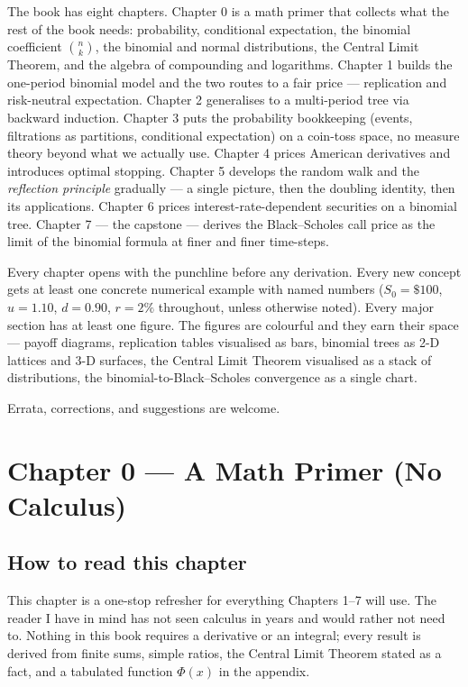 \documentclass[
  10pt,
  twoside]{book}
\begin{document}
The book has eight chapters. Chapter 0 is a math primer that collects
what the rest of the book needs: probability, conditional expectation,
the binomial coefficient \(\binom{n}{k}\), the binomial and normal
distributions, the Central Limit Theorem, and the algebra of compounding
and logarithms. Chapter 1 builds the one-period binomial model and the
two routes to a fair price --- replication and risk-neutral expectation.
Chapter 2 generalises to a multi-period tree via backward induction.
Chapter 3 puts the probability bookkeeping (events, filtrations as
partitions, conditional expectation) on a coin-toss space, no measure
theory beyond what we actually use. Chapter 4 prices American
derivatives and introduces optimal stopping. Chapter 5 develops the
random walk and the \emph{reflection principle} gradually --- a single
picture, then the doubling identity, then its applications. Chapter 6
prices interest-rate-dependent securities on a binomial tree. Chapter 7
--- the capstone --- derives the Black--Scholes call price as the limit
of the binomial formula at finer and finer time-steps.

Every chapter opens with the punchline before any derivation. Every new
concept gets at least one concrete numerical example with named numbers
(\(S_0=\$100\), \(u=1.10\), \(d=0.90\), \(r=2\%\) throughout, unless
otherwise noted). Every major section has at least one figure. The
figures are colourful and they earn their space --- payoff diagrams,
replication tables visualised as bars, binomial trees as 2-D lattices
and 3-D surfaces, the Central Limit Theorem visualised as a stack of
distributions, the binomial-to-Black--Scholes convergence as a single
chart.

Errata, corrections, and suggestions are welcome.

\newpage

\newpage

\chapter{Chapter 0 --- A Math Primer (No
Calculus)}\label{chapter-0-a-math-primer-no-calculus}

\section{How to read this chapter}\label{how-to-read-this-chapter}

This chapter is a one-stop refresher for everything Chapters 1--7 will
use. The reader I have in mind has not seen calculus in years and would
rather not need to. Nothing in this book requires a derivative or an
integral; every result is derived from finite sums, simple ratios, the
Central Limit Theorem stated as a fact, and a tabulated function
\(\Phi(x)\) in the appendix.
\end{document}
